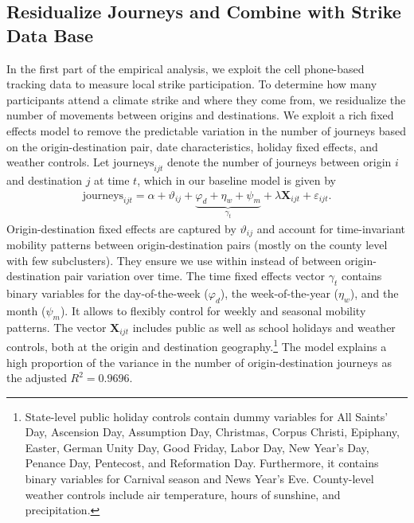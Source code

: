 \subsection{Residualize Journeys and Combine with Strike Data Base}



In the first part of the empirical analysis, we exploit the cell phone-based tracking data to measure local strike participation. To determine how many participants attend a climate strike and where they come from, we residualize the number of movements between origins and destinations. We exploit a rich fixed effects model to remove the predictable variation in the number of journeys based on the origin-destination pair, date characteristics, holiday fixed effects, and weather controls. Let $\text{journeys}_{ijt}$ denote the number of journeys between origin $i$ and destination $j$ at time $t$, which in our baseline model is given by 
\begin{align}
\text{journeys}_{ijt} = \alpha + \vartheta_{ij} + \underbrace{\varphi_d+\eta_w+\psi_m}_{\gamma_t} + \lambda \mathbf{X}_{ijt}  + \varepsilon_{ijt}. \label{eq_greta_cons:res_journeys}
\end{align}
Origin-destination fixed effects are captured by $\vartheta_{ij}$ and account for time-invariant mobility patterns between origin-destination pairs (mostly on the county level with few subclusters). They ensure we use within instead of between origin-destination pair variation over time. The time fixed effects vector $\gamma_t$ contains binary variables for the day-of-the-week ($\varphi_d$), the week-of-the-year ($\eta_w$), and the month ($\psi_m$). It allows to flexibly control for weekly and seasonal mobility patterns. The vector $\mathbf{X}_{ijt} $ includes public as well as school holidays and weather controls, both at the origin and destination geography.\footnote{State-level public holiday controls contain dummy variables for All Saints' Day, Ascension Day, Assumption Day, Christmas, Corpus Christi, Epiphany, Easter, German Unity Day, Good Friday, Labor Day, New Year's Day, Penance Day, Pentecost, and Reformation Day. Furthermore, it contains binary variables for Carnival season and News Year's Eve. County-level weather controls include air temperature, hours of sunshine, and precipitation.} The model explains a high proportion of the variance in the number of origin-destination journeys as the adjusted $R^2=0.9696$.


